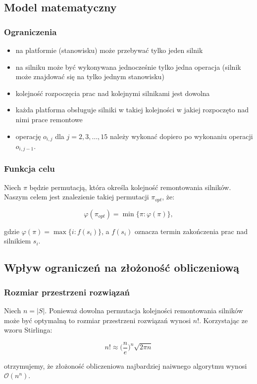 \documentclass{beamer}
\begin{document}
	\subsection{Model matematyczny}
		\begin{frame}
			\frametitle{Ograniczenia}
			
			\begin{itemize}
				\item na platformie (stanowisku) może przebywać tylko jeden silnik
				\item<2-> na silniku może być wykonywana jednocześnie tylko jedna operacja (silnik może znajdować się na tylko jednym stanowisku)
				\item<3-> kolejność rozpoczęcia prac nad kolejnymi silnikami jest dowolna
				\item<4-> każda platforma obsługuje silniki w takiej kolejności w jakiej rozpoczęto nad nimi prace remontowe
				\item<5-> operację $o_{i,j}$ dla $j = 2, 3, \dots, 15$ należy wykonać dopiero po wykonaniu operacji $o_{i,j - 1}$.
			\end{itemize}
		\end{frame}
		
		\begin{frame}
			\frametitle{Funkcja celu}
			
			Niech $\pi$ będzie permutacją, która określa kolejność remontowania silników. Naszym celem jest znalezienie takiej permutacji $\pi_{opt}$, że:
			
			\begin{equation*}
				\varphi ( \pi_{opt} ) = \min \{ \pi: \varphi ( \pi ) \},
			\end{equation*}
			
			gdzie $\varphi ( \pi ) = \max \{ i: f(s_i) \}$, a $f(s_i)$ oznacza termin zakończenia prac nad silnikiem $s_i$.
		\end{frame}
	
	\subsection{Wpływ ograniczeń na złożoność obliczeniową}
		\begin{frame}
			\frametitle{Rozmiar przestrzeni rozwiązań}
			
			Niech $n = |S|$. Ponieważ dowolna permutacja kolejności remontowania silników może być optymalną to rozmiar przestrzeni rozwiązań wynosi $n!$. Korzystając ze wzoru Stirlinga:
			
			\begin{equation*}
				n! \approx \Big( \frac{n}{e} \Big)^n \sqrt{2 \pi n}
			\end{equation*}
			
			otrzymujemy, że złożoność obliczeniowa najbardziej naiwnego algorytmu wynosi $\mathcal{O}(n^n)$.
		\end{frame}
		
\end{document}
